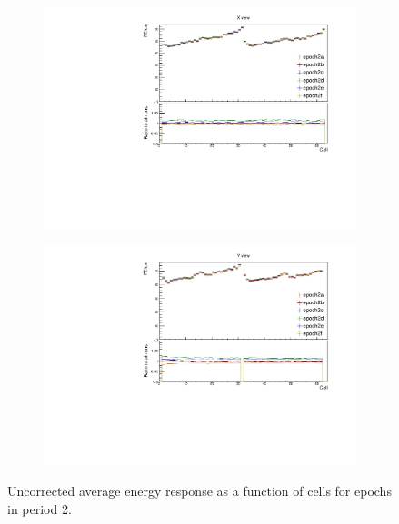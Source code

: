 \documentclass[12pt,a4paper]{article}
\begin{document}
\begin{figure}[!hbtp]
\centering
\begin{subfigure}[b]{0.495\textwidth}
\centering
\includegraphics[width=\textwidth]{Plots/Attenprofs_P2Data_CellPE_X_Combined.pdf}
\end{subfigure}
\begin{subfigure}[b]{0.495\textwidth}
\centering
\includegraphics[width=\textwidth]{Plots/Attenprofs_P2Data_CellPE_Y_Combined.pdf}
\end{subfigure}
\caption{Uncorrected average energy response as a function of cells for epochs in period 2.}
\label{figCalibhistCellPE_period2}
\end{figure}
\end{document}
